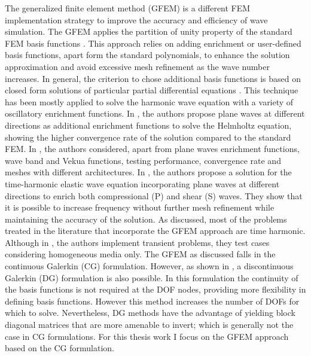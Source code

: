 The generalized finite element method (GFEM) is a different FEM implementation strategy to improve the accuracy and efficiency of wave simulation. The GFEM applies the  partition of unity property of the standard FEM basis functions \cite{BABUSKA1997}. This approach relies on adding enrichment or user-defined basis functions,  apart form the standard polynomials, to enhance the solution approximation and  avoid excessive mesh refinement as the wave number increases. In general, the criterion to chose  additional basis functions is based on closed form solutions of particular partial differential equations \cite{Strouboulis2000, Babuska1997a}. This technique has been mostly applied to solve the  harmonic wave equation with a variety of oscillatory enrichment functions. In \cite{Strouboulis2006, Babuska1997a}, the authors propose plane waves at different directions as  additional enrichment functions to solve the Helmholtz equation,  showing the higher convergence rate of the solution compared to the standard FEM. In \cite{Strouboulis2008}, the authors  considered, apart from  plane waves enrichment functions,  wave band and Vekua functions, testing performance, convergence rate and meshes with different architectures. In \cite{ElKacimi2009}, the authors propose a solution for the time-harmonic elastic wave equation incorporating plane waves at different directions to enrich both compressional (P) and shear (S) waves. They show that it is possible to increase frequency without further mesh refinement while maintaining  the accuracy of the solution. As discussed, most of the problems treated in the literature that incorporate the GFEM approach are time harmonic. Although in \cite{Ham2012},  the authors implement transient problems, they test cases considering homogeneous media only. The GFEM as discussed falls in the continuous Galerkin (CG) formulation. However, as shown in \cite{Hiptmair2016}, a discontinuous Galerkin (DG) formulation is also possible. In this formulation the continuity of the basis functions is not required at the DOF nodes, providing more flexibility in defining basis functions. However this method increases the number of DOFs for which to solve. Nevertheless, DG methods have the advantage of yielding block diagonal matrices that are more amenable to invert; which is generally not the case in CG formulations. For this thesis work I focus on the GFEM approach based on the CG formulation.

